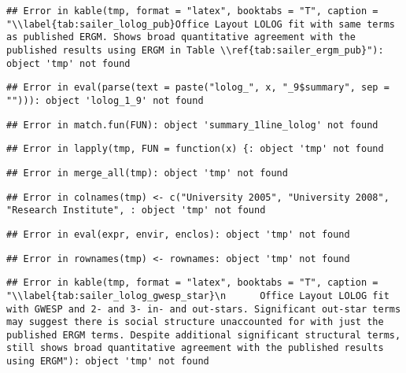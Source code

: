 \documentclass[
]{statsoc}
\begin{document}
\begin{verbatim}
## Error in kable(tmp, format = "latex", booktabs = "T", caption = "\\label{tab:sailer_lolog_pub}Office Layout LOLOG fit with same terms as published ERGM. Shows broad quantitative agreement with the published results using ERGM in Table \\ref{tab:sailer_ergm_pub}"): object 'tmp' not found
\end{verbatim}

\begin{verbatim}
## Error in eval(parse(text = paste("lolog_", x, "_9$summary", sep = ""))): object 'lolog_1_9' not found
\end{verbatim}

\begin{verbatim}
## Error in match.fun(FUN): object 'summary_1line_lolog' not found
\end{verbatim}

\begin{verbatim}
## Error in lapply(tmp, FUN = function(x) {: object 'tmp' not found
\end{verbatim}

\begin{verbatim}
## Error in merge_all(tmp): object 'tmp' not found
\end{verbatim}

\begin{verbatim}
## Error in colnames(tmp) <- c("University 2005", "University 2008", "Research Institute", : object 'tmp' not found
\end{verbatim}

\begin{verbatim}
## Error in eval(expr, envir, enclos): object 'tmp' not found
\end{verbatim}

\begin{verbatim}
## Error in rownames(tmp) <- rownames: object 'tmp' not found
\end{verbatim}

\begin{verbatim}
## Error in kable(tmp, format = "latex", booktabs = "T", caption = "\\label{tab:sailer_lolog_gwesp_star}\n      Office Layout LOLOG fit with GWESP and 2- and 3- in- and out-stars. Significant out-star terms may suggest there is social structure unaccounted for with just the published ERGM terms. Despite additional significant structural terms, still shows broad quantitative agreement with the published results using ERGM"): object 'tmp' not found
\end{verbatim}
\end{document}
